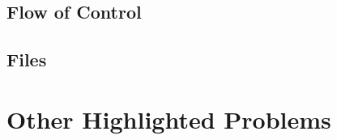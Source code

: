\documentclass{article}
\begin{document}
\subsection{Flow of Control}
\subsection{Files}

\section{Other Highlighted Problems}
\end{document}
